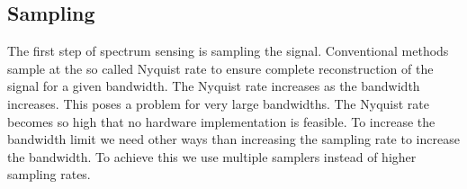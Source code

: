 \documentclass[a4paper, openany, oneside]{memoir}
\begin{document}
\subsection{Sampling}
The first step of spectrum sensing is sampling the signal. Conventional methods sample at the so called Nyquist rate to ensure complete reconstruction of the signal for a given bandwidth. The Nyquist rate increases as the bandwidth increases. This poses a problem for very large bandwidths. The Nyquist rate becomes so high that no hardware implementation is feasible. To increase the bandwidth limit we need other ways than increasing the sampling rate to increase the bandwidth. To achieve this we use multiple samplers instead of higher sampling rates.
\end{document}
